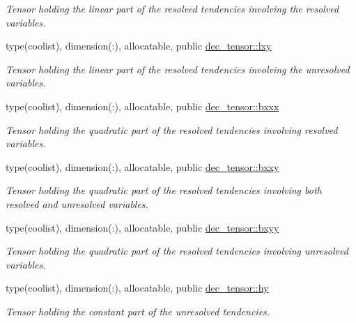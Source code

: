 \begin{DoxyCompactItemize}
\begin{DoxyCompactList}\small\item\em Tensor holding the linear part of the resolved tendencies involving the resolved variables. \end{DoxyCompactList}\item 
type(coolist), dimension(\+:), allocatable, public \hyperlink{namespacedec__tensor_a994871cb59cfc0743f3d2a22aa81abc4}{dec\+\_\+tensor\+::lxy}
\begin{DoxyCompactList}\small\item\em Tensor holding the linear part of the resolved tendencies involving the unresolved variables. \end{DoxyCompactList}\item 
type(coolist), dimension(\+:), allocatable, public \hyperlink{namespacedec__tensor_ad4649ed646f1d4cdb0997880e4f39969}{dec\+\_\+tensor\+::bxxx}
\begin{DoxyCompactList}\small\item\em Tensor holding the quadratic part of the resolved tendencies involving resolved variables. \end{DoxyCompactList}\item 
type(coolist), dimension(\+:), allocatable, public \hyperlink{namespacedec__tensor_ad451ae880f34cc385482e33b45070dcd}{dec\+\_\+tensor\+::bxxy}
\begin{DoxyCompactList}\small\item\em Tensor holding the quadratic part of the resolved tendencies involving both resolved and unresolved variables. \end{DoxyCompactList}\item 
type(coolist), dimension(\+:), allocatable, public \hyperlink{namespacedec__tensor_aa11fd10e3419deddd481098f4a2d2949}{dec\+\_\+tensor\+::bxyy}
\begin{DoxyCompactList}\small\item\em Tensor holding the quadratic part of the resolved tendencies involving unresolved variables. \end{DoxyCompactList}\item 
type(coolist), dimension(\+:), allocatable, public \hyperlink{namespacedec__tensor_a9c51afb9b52f76670bcb3496d32fabf3}{dec\+\_\+tensor\+::hy}
\begin{DoxyCompactList}\small\item\em Tensor holding the constant part of the unresolved tendencies. \end{DoxyCompactList}\item 

\end{DoxyCompactItemize}
